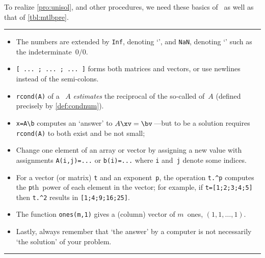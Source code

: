 \begin{table}
\caption{To realize \cref{pro:unisol}, and other procedures, we need these basics of \script\ as well as that of \cref{tbl:mtlbpre}.} \label{tbl:mtlbbasics}
\hrule
\begin{minipage}{\linewidth}
\begin{itemize}
\item The  numbers are extended by \verb|Inf|, denoting `', and \verb|NaN|, denoting `' such as the indeterminate~\(0/0\).
\item {}\verb|[ ... ; ... ; ... ]| forms both matrices and vectors, or use newlines instead of the semi-colons.
\item {}\verb|rcond(A)|  of a ~\(A\) \emph{estimates} the reciprocal of the so-called  of~\(A\) (defined precisely by \cref{def:condnum}).
\item {}\verb|x=A\b| computes an `answer' to \(A\xv=\bv\)\,---but to be a solution requires \verb|rcond(A)| to both exist and be not small;
\item {}Change one element of an array or vector by assigning a new value with assignments \verb|A(i,j)=...| or \verb|b(i)=...| where \verb|i| and~\verb|j| denote some indices.
\item {}For a vector (or matrix) \verb|t| and an exponent~\verb|p|, the operation \verb|t.^p| computes the \verb|p|th~power of each element in the vector; for example, if \verb|t=[1;2;3;4;5]| then \verb|t.^2| results in \verb|[1;4;9;16;25]|.
\item The function \verb|ones(m,1)| gives a (column) vector of \(m\)~ones, \((1,1,\ldots,1)\).
\item Lastly, always remember that `the answer' by a computer is not necessarily `the solution' of your problem.
\end{itemize}
\end{minipage}
\hrule
\end{table}

